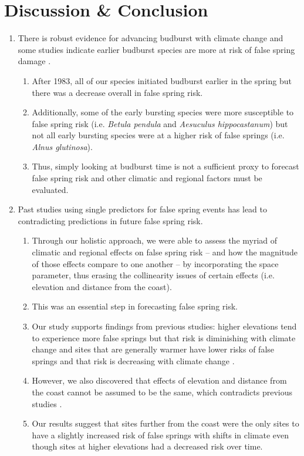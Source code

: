 \documentclass{article}\usepackage[]{graphicx}\usepackage[]{color}
\begin{document}
\section*{Discussion \& Conclusion}
\begin{enumerate}
\item There is robust evidence for advancing budburst with climate change \citep{Cleland2007, Wolkovich2012, IPCC2014} and some studies indicate earlier budburst species are more at risk of false spring damage \citep{Ma2018}.
  \begin{enumerate}
  \item After 1983, all of our species initiated budburst earlier in the spring but there was a decrease overall in false spring risk.
  \item Additionally, some of the early bursting species were more susceptible to false spring risk (i.e. \textit{Betula pendula} and \textit{Aesuculus hippocastanum}) but not all early bursting species were at a higher risk of false springs (i.e. \textit{Alnus glutinosa}). 
  \item Thus, simply looking at budburst time is not a sufficient proxy to forecast false spring risk and other climatic and regional factors must be evaluated.
  \end{enumerate}
  
\item Past studies using single predictors for false spring events has lead to contradicting predictions in future false spring risk.
  \begin{enumerate}
  \item Through our holistic approach, we were able to assess the myriad of climatic and regional effects on false spring risk -- and how the magnitude of those effects compare to one another -- by incorporating the space parameter, thus erasing the collinearity issues of certain effects (i.e. elevation and distance from the coast).
  \item This was an essential step in forecasting false spring risk.
  \item Our study supports findings from previous studies: higher elevations tend to experience more false springs but that risk is diminishing with climate change \citep{Vitra2017} and sites that are generally warmer have lower risks of false springs and that risk is decreasing with climate change \citep{Wypych2016}.
  \item However, we also discovered that effects of elevation and distance from the coast cannot be assumed to be the same, which contradicts previous studies \citep{Ma2018}.
  \item Our results suggest that sites further from the coast were the only sites to have a slightly increased risk of false springs with shifts in climate even though sites at higher elevations had a decreased risk over time. 
  \end{enumerate}
  

\end{enumerate}
\end{document}
